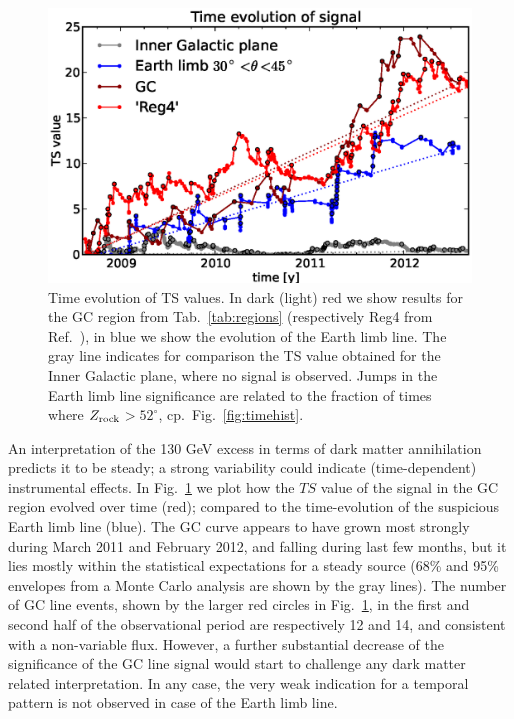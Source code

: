 \documentclass[aps,twocolumn,prd,superscriptaddress,showpacs,nofootinbib,fixfloat]{revtex4}
\newcommand{\zrock}{$Z_{\rm rock}$}
\begin{document}
\begin{figure}
  \begin{center}
    \includegraphics[width=1.0\linewidth]{plots/TS_time.eps}
  \end{center}
  \caption{Time evolution of TS values. In dark (light) red we show results
  for the GC region from Tab.~\ref{tab:regions} (respectively Reg4 from
  Ref.~\cite{Weniger:2012}), in blue we show the evolution of the Earth limb
  line. The gray line indicates for comparison the TS value obtained for the
  Inner Galactic plane, where no signal is observed.  Jumps in the Earth limb
  line significance are related to the fraction of times where
  \zrock$>52^\circ$, cp.~Fig.~\ref{fig:timehist}.}
  \label{fig:timeevolution}
\end{figure}

An interpretation of the 130 GeV excess in
terms of dark matter annihilation predicts it to be steady;
a strong variability could
indicate (time-dependent) instrumental effects. In
Fig.~\ref{fig:timeevolution} we plot how the $TS$ value of
the signal in the GC region evolved over time (red);
compared to the time-evolution of the suspicious Earth limb
line (blue). The GC curve appears to have grown most
strongly during March 2011 and February 2012, and falling
during last few months, but it lies mostly within the
statistical expectations for a steady source (68\% and 95\% envelopes from a
Monte Carlo analysis are shown by the gray lines). The number of
GC line events, shown by the larger red circles in
Fig.~\ref{fig:timeevolution}, in the first and second half
of the observational period are respectively 12 and 14, and
consistent with a non-variable flux. However, a further
substantial decrease of the significance of the GC line
signal would start to challenge any dark matter related
interpretation. In any case, the very weak indication for
a temporal pattern is not observed in case of the Earth limb
line. 
\end{document}
